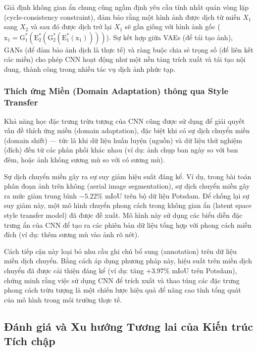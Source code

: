Giả định không gian ẩn chung cũng ngầm định yêu cầu tính nhất quán vòng lặp 
(cycle-consistency constraint), đảm bảo rằng một hình ảnh được dịch từ miền $X_1$ 
sang $X_2$ và sau đó được dịch trở lại $X_1$ sẽ gần giống với hình ảnh gốc 
($\text{x}_1 = \text{G}^*_1(\text{E}^*_2(\text{G}^*_2(\text{E}^*_1(\text{x}_1))))$).\cite{Liu2017} 
Sự kết hợp giữa VAEs (để tái tạo ảnh), GANs (để đảm bảo ảnh dịch là thực tế) 
và ràng buộc chia sẻ trọng số (để liên kết các miền) cho phép CNN hoạt động như 
một nền tảng trích xuất và tái tạo nội dung, thành công trong nhiều tác vụ dịch ảnh phức tạp.

\subsubsection{Thích ứng Miền (Domain Adaptation) thông qua Style Transfer}

Khả năng học đặc trưng trừu tượng của CNN cũng được sử dụng để giải quyết vấn đề thích ứng 
miền (domain adaptation), đặc biệt khi có sự dịch chuyển miền (domain shift) — tức là khi 
dữ liệu huấn luyện (nguồn) và dữ liệu thử nghiệm (đích) đến từ các phân phối khác nhau 
(ví dụ: ảnh chụp ban ngày so với ban đêm, hoặc ảnh không sương mù so với có sương mù).\cite{WangLAST}

Sự dịch chuyển miền gây ra sự suy giảm hiệu suất đáng kể. Ví dụ, trong bài toán phân đoạn ảnh 
trên không (aerial image segmentation), sự dịch chuyển miền gây ra mức giảm trung 
bình $-5.22\%$ mIoU trên bộ dữ liệu Potsdam.\cite{WangLAST} Để chống lại sự suy giảm này, 
một mô hình chuyển phong cách trong không gian ẩn (latent space style transfer model) đã 
được đề xuất.\cite{WangLAST} Mô hình này sử dụng các biểu diễn đặc trưng ẩn của CNN để tạo 
ra các phiên bản dữ liệu tổng hợp với phong cách miền đích (ví dụ: thêm sương mù vào ảnh rõ nét).

Cách tiếp cận này loại bỏ nhu cầu ghi chú bổ sung (annotation) trên dữ liệu miền dịch 
chuyển.\cite{WangLAST} Bằng cách áp dụng phương pháp này, hiệu suất trên miền 
dịch chuyển đã được cải thiện đáng kể (ví dụ: tăng $+3.97\%$ mIoU trên Potsdam), 
chứng minh rằng việc sử dụng CNN để trích xuất và thao túng các đặc trưng phong cách 
trừu tượng là một chiến lược hiệu quả để nâng cao tính tổng quát của mô hình trong môi 
trường thực tế.

\subsection{Đánh giá và Xu hướng Tương lai của Kiến trúc Tích chập}

